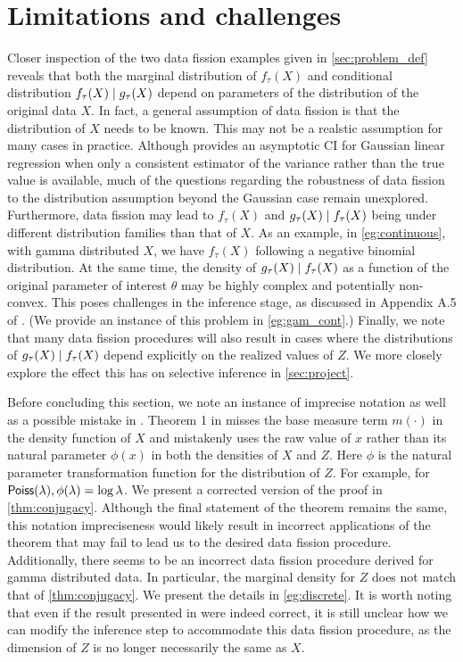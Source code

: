 \section{Limitations and challenges}\label{sec:challenge}
Closer inspection of the two data fission examples given in \cref{sec:problem_def} reveals that both the marginal distribution of $f_\tau(X)$ and conditional distribution $f_\tau(X) \mid g_\tau(X)$ depend on parameters of the distribution of the original data $X$. In fact, a general assumption of data fission is that the distribution of $X$ needs to be known. This may not be a realstic assumption for many cases in practice. Although \cite{leiner2022data} provides an asymptotic CI for Gaussian linear regression when only a consistent estimator of the variance rather than the true value is available, much of the questions regarding the robustness of data fission to the distribution assumption beyond the Gaussian case remain unexplored. Furthermore, data fission may lead to $f_\tau(X)$ and $g_\tau(X) \mid f_\tau(X)$ being under different distribution families than that of $X$. As an example, in \cref{eg:continuous}, with gamma distributed $X$, we have $f_\tau(X)$ following a negative binomial distribution. At the same time, the density of $g_\tau(X)\mid f_\tau(X)$ as a function of the original parameter of interest $\theta$ may be highly complex and potentially non-convex. This poses challenges in the inference stage, as discussed in Appendix A.5 of \cite{leiner2022data}. (We provide an instance of this problem in \cref{eg:gam_cont}.) Finally, we note that many data fission procedures will also result in cases where the distributions of $g_\tau(X)\mid f_\tau(X)$ depend explicitly on the realized values of $Z$. We more closely explore the effect this has on selective inference in \cref{sec:project}.

Before concluding this section, we note an instance of imprecise notation as well as a possible mistake in \cite{leiner2022data}. Theorem 1 in \cite{leiner2022data} misses the base measure term $m(\cdot)$ in the density function of $X$ and mistakenly uses the raw value of $x$ rather than its natural parameter $\phi(x)$ in both the densities of $X$ and $Z$. Here $\phi$ is the natural parameter transformation function for the distribution of $Z$. For example, for ${\sf{Poiss}}(\lambda), \phi(\lambda) = \log\lambda$. We present a corrected version of the proof in \cref{thm:conjugacy}. Although the final statement of the theorem remains the same, this notation impreciseness would likely result in incorrect applications of the theorem that may fail to lead us to the desired data fission procedure. Additionally, there seems to be an incorrect data fission procedure derived for gamma distributed data. In particular, the marginal density for $Z$ does not match that of \cref{thm:conjugacy}. We present the details in \cref{eg:discrete}. It is worth noting that even if the result presented in \cite{leiner2022data} were indeed correct, it is still unclear how we can modify the inference step to accommodate this data fission procedure, as the dimension of $Z$ is no longer necessarily the same as $X$.